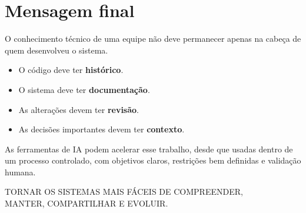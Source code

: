 \section{Mensagem final}

O conhecimento técnico de uma equipe não deve permanecer apenas na cabeça de quem desenvolveu o sistema.

\begin{itemize}
  \item O código deve ter \textbf{histórico}.
  \item O sistema deve ter \textbf{documentação}.
  \item As alterações devem ter \textbf{revisão}.
  \item As decisões importantes devem ter \textbf{contexto}.
\end{itemize}

As ferramentas de IA podem acelerar esse trabalho, desde que usadas dentro de um processo controlado, com objetivos claros, restrições bem definidas e validação humana.

\begin{center}
\end{center}

\vspace{4mm}
\begin{center}
\begin{minipage}{\linewidth}\centering
{\titulofonte\fontsize{24}{28}\selectfont\color{azulMB} TORNAR OS SISTEMAS MAIS FÁCEIS DE COMPREENDER,\\ MANTER, COMPARTILHAR E EVOLUIR.}
\end{minipage}
\end{center}
